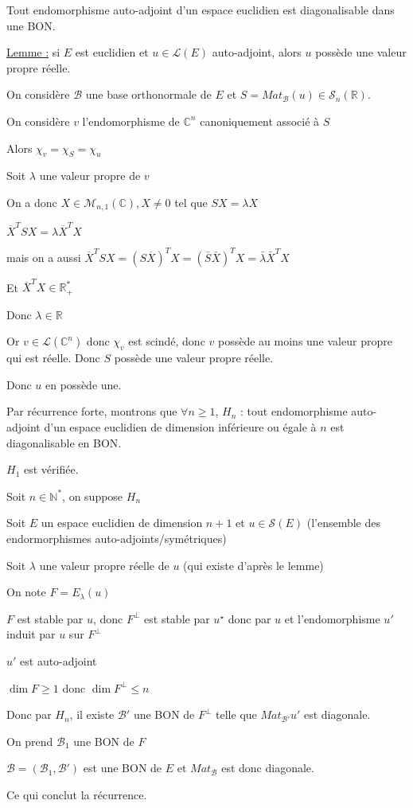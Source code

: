 \documentclass[a4paper,12pt]{book}
\newcommand{\Thr}[2]{\begin{tcolorbox}[sharp corners, colback=white,colframe=red!90!black!75, title=Théorème : #1]#2\end{tcolorbox}}
\newcommand{\Pre}[1]{\begin{tcolorbox}[sharp corners, colback=white,colframe=green!60!green!30!black!75, title=Preuve]#1\end{tcolorbox}}
\def\R{\mathbb{R}}
\def\C{\mathbb{C}}
\def\N{\mathbb{N}}
\begin{document}
\Thr{Théorème spectral}{Tout endomorphisme auto-adjoint d'un espace euclidien est diagonalisable dans une BON.}
\Pre{\underline{Lemme :} si $E$ est euclidien et $u\in\mathcal{L}(E)$ auto-adjoint, alors $u$ possède une valeur propre réelle.
\par On considère $\mathcal{B}$ une base orthonormale de $E$ et $S=Mat_\mathcal{B}(u)\in\mathcal{S}_n(\R)$.
\par On considère $v$ l'endomorphisme de $\C^n$ canoniquement associé à $S$
\par Alors $\chi_v=\chi_S=\chi_u$
\par Soit $\lambda$ une valeur propre de $v$
\par On a donc $X\in\mathcal{M}_{n,1}(\C), X\neq 0$ tel que $SX=\lambda X$
\par $\overline{X}^T SX = \lambda \overline{X}^TX$
\par mais on a aussi $\overline{X}^TSX=(S\overline{X})^TX=(\bar{S}\bar{X})^TX=\bar{\lambda}\bar{X}^TX$
\par Et $\overline{X}^TX\in\R_+^*$
\par Donc $\lambda\in\R$
\par Or $v\in\mathcal{L}(\C^n)$ donc $\chi_v$ est scindé, donc $v$ possède au moins une valeur propre qui est réelle. Donc $S$ possède une valeur propre réelle.
\par Donc $u$ en possède une.
\par Par récurrence forte, montrons que $\forall n\geq 1$, $H_n$ : tout endomorphisme auto-adjoint d'un espace euclidien de dimension inférieure ou égale à $n$ est diagonalisable en BON.
\par $H_1$ est vérifiée.
\par Soit $n\in\N^*$, on suppose $H_n$
\par Soit $E$ un espace euclidien de dimension $n+1$ et $u\in\mathcal{S}(E)$ (l'ensemble des endormorphismes auto-adjoints/symétriques)
\par Soit $\lambda$ une valeur propre réelle de $u$ (qui existe d'après le lemme)
\par On note $F= E_\lambda(u)$
\par $F$ est stable par $u$, donc $F^\perp$ est stable par $u^\star$ donc par $u$ et l'endomorphisme $u'$ induit par $u$ sur $F^\perp$
\par $u'$ est auto-adjoint
\par $\dim F\geq 1$ donc $\dim F^\perp\leq n$
\par Donc par $H_n$, il existe $\mathcal{B'}$ une BON de $F^\perp$ telle que $Mat_{\mathcal{B}'}u'$ est diagonale.
\par On prend $\mathcal{B}_1$ une BON de $F$
\par $\mathcal{B}=(\mathcal{B}_1,\mathcal{B}')$ est une BON de $E$ et $Mat_\mathcal{B}$ est donc diagonale.
\par Ce qui conclut la récurrence.}
\end{document}
